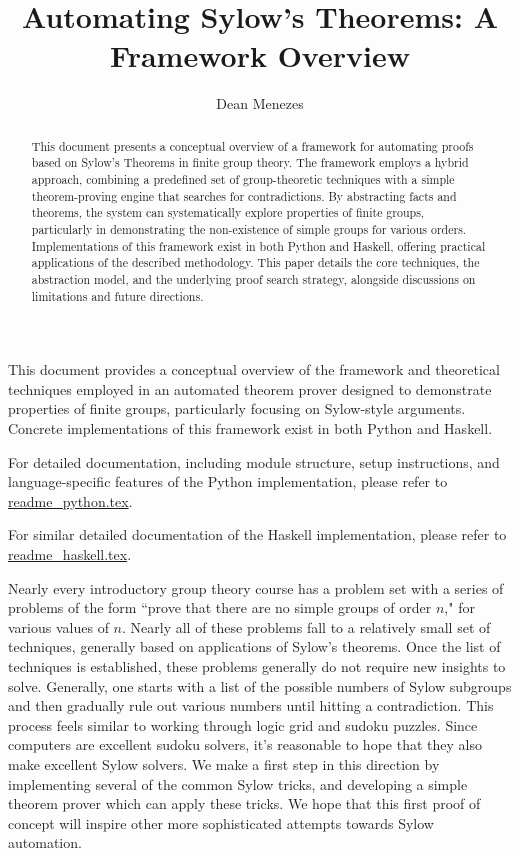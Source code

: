 \documentclass[11pt,
oneside]{article} %
\title{Automating Sylow's Theorems: A Framework Overview}
\author{Dean Menezes}
\begin{document}
\maketitle

\begin{abstract}
This document presents a conceptual overview of a framework for automating proofs based on Sylow's Theorems in finite group theory. The framework employs a hybrid approach, combining a predefined set of group-theoretic techniques with a simple theorem-proving engine that searches for contradictions. By abstracting facts and theorems, the system can systematically explore properties of finite groups, particularly in demonstrating the non-existence of simple groups for various orders. Implementations of this framework exist in both Python and Haskell, offering practical applications of the described methodology. This paper details the core techniques, the abstraction model, and the underlying proof search strategy, alongside discussions on limitations and future directions.
\end{abstract}

This document provides a conceptual overview of the framework and theoretical techniques employed in an automated theorem prover designed to demonstrate properties of finite groups, particularly focusing on Sylow-style arguments. Concrete implementations of this framework exist in both Python and Haskell.

For detailed documentation, including module structure, setup instructions, and language-specific features of the Python implementation, please refer to \href{readme_python.tex}{readme\_python.tex}.

For similar detailed documentation of the Haskell implementation, please refer to \href{readme_haskell.tex}{readme\_haskell.tex}.

Nearly every introductory group theory course has a problem set with a
series of problems of the form ``prove that there are no simple groups
of order $n$," for various values of $n$. Nearly all of these
problems fall to a relatively small set of techniques, generally based
on applications of Sylow's theorems. Once the list of techniques is
established, these problems generally do not require new insights to
solve. Generally, one starts with a list of the possible numbers of
Sylow subgroups and then gradually rule out various numbers until
hitting a contradiction. This process feels similar to working
through logic grid and sudoku puzzles. Since computers are excellent
sudoku solvers, it's reasonable to hope that they also make excellent
Sylow solvers. We make a first step in this direction by implementing
several of the common Sylow tricks, and developing a simple theorem
prover which can apply these tricks. We hope that this first proof of
concept will inspire other more sophisticated attempts towards Sylow
automation.
\end{document}
